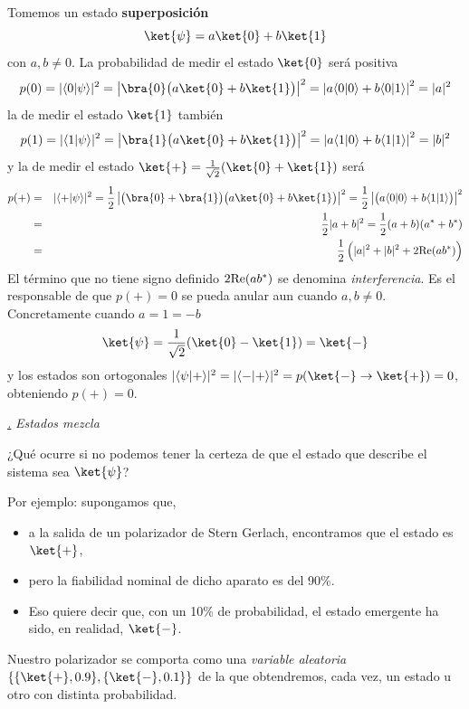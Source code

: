 \documentclass[a4paper,11pt]{book} %
\numberwithin{equation}{chapter}
\newcommand{\braket}[2]{\langle #1|#2\rangle}
\def\subsubiContadorIt{\par\addtocounter{subsubsection}{1}\underline{\it\thesubsubsection.}\hskip0.5cm \setcounter{subsubsubsectionIt}{0}}
\newcommand{\SubsubiIt}[1]{
		\subsubiContadorIt \textit{#1}
	}
\newcounter{subsubsubsectionIt}[subsubsection]
\begin{document}
Tomemos un estado \textbf{superposición} 
	\begin{equation}
	\ket{\psi} = a\ket{0} + b\ket{1}
	\end{equation}
con $a,b \neq 0$. 
La probabilidad de medir el estado $\ket{0}$ será positiva
	\begin{equation}
	p(0) = |\braket{0}{\psi}|^2  = 
\left\vert\bra{0}\big(a\ket{0}+b\ket{1}\big)\right\vert^2=\left\vert a\braket{0}{0}+b \braket{0}{1}\right\vert^2 = |a|^2
	\end{equation}
la de medir el estado $\ket{1}$ también
	\begin{equation}
	p(1) = |\braket{1}{\psi}|^2  = \left\vert\bra{1}\big(a\ket{0}+b\ket{1}\big)\right\vert^2 =\left\vert a\braket{1}{0}+b \braket{1}{1}\right\vert^2= |b|^2
	\end{equation}
y la de medir el estado $\ket{+} =  \frac{1}{\sqrt{2}}(\ket{0}+\ket{1})$ será
\begin{eqnarray}
p(+)&=&|\braket{+}{\psi}|^2 =  \frac{1}{2}\left\vert\big(\bra{0}+ \bra{1}\big)\big(a\ket{0}+b\ket{1}\big)\right\vert^2 = \frac{1}{2}\left\vert\big(a\braket{0}{0}+b\braket{1}{1}\big)
\right\vert^2  \nonumber \\
&=&\frac{1}{2}|a+b|^2  = \frac{1}{2}(a+b)(a^* + b^*) 
\\
&=& \frac{1}{2}\left(\rule{0mm}{4mm} |a|^2 + |b|^2 + 2{\rm Re}(ab^*) \right) \nonumber
\end{eqnarray}    
El término que no tiene signo definido $2{\rm Re}(ab^*)$ se denomina \textit{interferencia}. 
 Es el responsable de que $p(+)=0$ se pueda anular aun cuando $a,b\neq 0$. Concretamente cuando $a=1=-b$
	\begin{equation}
	\ket{\psi}=   \frac{1}{\sqrt{2}}(\ket{0}-\ket{1}) = \ket{-}
	\end{equation}
y los estados son ortogonales $|\braket{\psi}{+}|^2=|\braket{-}{+}|^2= p(\ket{-}\to\ket{+})=0$, obteniendo $p(+)=0$.

			\SubsubiIt{Estados mezcla}
			
¿Qué ocurre si no podemos tener la certeza de que el estado que describe el sistema sea $\ket{\psi}$?  

Por ejemplo: supongamos que, 
\begin{itemize}
	\item a la salida de un polarizador de Stern Gerlach, encontramos que el estado es $\ket{+}$, 
	\item pero la fiabilidad nominal de dicho aparato es del 90\%. 
	\item Eso quiere decir que, con un 10\% de probabilidad, el estado emergente ha sido, en realidad, $\ket{-}$.
\end{itemize}
Nuestro polarizador se comporta como una \textit{variable aleatoria} $ \{\{\ket{+},0.9\},\{\ket{-},0.1\}\}$ de la que obtendremos, cada vez, un estado u otro con distinta probabilidad. 
\end{document}
